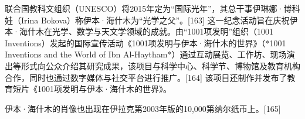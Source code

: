联合国教科文组织（UNESCO）将2015年定为“国际光年”，其总干事伊琳娜·博科娃（Irina Bokova）称伊本·海什木为“光学之父”。[163] 这一纪念活动旨在庆祝伊本·海什木在光学、数学与天文学领域的成就。由“1001项发明”组织（1001 Inventions）发起的国际宣传活动《1001项发明与伊本·海什木的世界》（*1001 Inventions and the World of Ibn Al-Haytham*）通过互动展览、工作坊、现场演出等形式向公众介绍其研究成果，该项目与科学中心、科学节、博物馆及教育机构合作，同时也通过数字媒体与社交平台进行推广。[164] 该项目还制作并发布了教育短片《1001项发明与伊本·海什木的世界》。

伊本·海什木的肖像也出现在伊拉克第2003年版的10,000第纳尔纸币上。[165]
